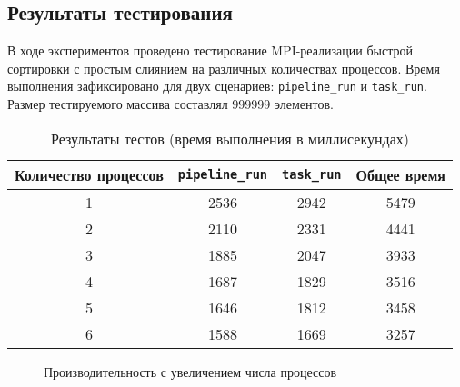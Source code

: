 \documentclass[12pt]{article}
\begin{document}
\subsection*{Результаты тестирования}
В ходе экспериментов проведено тестирование MPI-реализации быстрой сортировки с простым слиянием на различных количествах процессов. Время выполнения зафиксировано для двух сценариев: \texttt{pipeline\_run} и \texttt{task\_run}. Размер тестируемого массива составлял 999999 элементов.

\begin{table}[H]
\centering
\caption{Результаты тестов (время выполнения в миллисекундах)}
\begin{tabular}{|c|c|c|c|}
\hline
\textbf{Количество процессов} & \textbf{\texttt{pipeline\_run}} & \textbf{\texttt{task\_run}} & \textbf{Общее время} \\ \hline
1                              & 2536                           & 2942                        & 5479                 \\ \hline
2                              & 2110                           & 2331                        & 4441                 \\ \hline
3                              & 1885                           & 2047                        & 3933                 \\ \hline
4                              & 1687                           & 1829                        & 3516                 \\ \hline
5                              & 1646                           & 1812                        & 3458                 \\ \hline
6                              & 1588                           & 1669                        & 3257                 \\ \hline
\end{tabular}
\end{table}

\begin{figure}[H]
\centering
{}
\caption{Производительность с увеличением числа процессов}
\label{fig:mpi_perf}
\end{figure}
\end{document}

